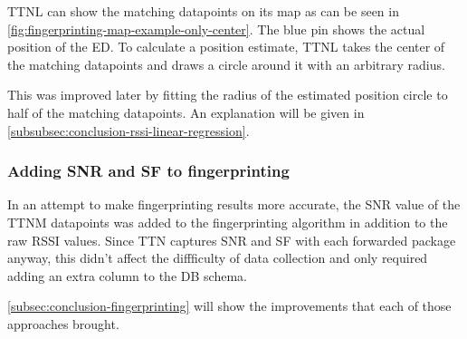 \ac{TTNL} can show the matching datapoints on its map as can be seen in \cref{fig:fingerprinting-map-example-only-center}.
The blue pin shows the actual position of the \acl{ED}.
To calculate a position estimate, \ac{TTNL} takes the center of the matching datapoints and draws a circle around it with an arbitrary radius.

This was improved later by fitting the radius of the estimated position circle to half of the matching datapoints.
An explanation will be given in \cref{subsubsec:conclusion-rssi-linear-regression}.

\subsubsection{Adding \acf{SNR} and \acf{SF} to fingerprinting}\label{sec:adding-snr-to-fingerprinting}

In an attempt to make fingerprinting results more accurate, the \ac{SNR} value of the \ac{TTNM} datapoints was added to the fingerprinting algorithm in addition to the raw \ac{RSSI} values.
Since \ac{TTN} captures \ac{SNR} and \ac{SF} with each forwarded package anyway, this didn't affect the diffficulty of data collection and only required adding an extra column to the \ac{DB} schema.

\cref{subsec:conclusion-fingerprinting} will show the improvements that each of those approaches brought.